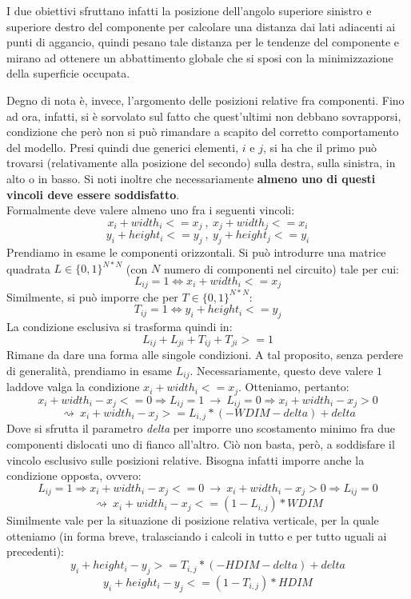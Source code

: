 I due obiettivi sfruttano infatti la posizione dell'angolo superiore sinistro e superiore destro del componente per calcolare una distanza dai lati adiacenti ai punti di aggancio, quindi pesano tale distanza per le tendenze del componente e mirano ad ottenere un abbattimento globale che si sposi con la minimizzazione della superficie occupata.

Degno di nota è, invece, l'argomento delle posizioni relative fra componenti. Fino ad ora, infatti, si è sorvolato sul fatto che quest'ultimi non debbano sovrapporsi, condizione che però non si può rimandare a scapito del corretto comportamento del modello. Presi quindi due generici elementi, $i$ e $j$, si ha che il primo può trovarsi (relativamente alla posizione del secondo) sulla destra, sulla sinistra, in alto o in basso. Si noti inoltre che necessariamente \textbf{almeno uno di questi vincoli deve essere soddisfatto}.\\
Formalmente deve valere almeno uno fra i seguenti vincoli:
$$ x_i + width_i <= x_j~,~x_j + width_j <= x_i$$ $$y_i + height_i <= y_j~,~y_j + height_j <= y_i $$
Prendiamo in esame le componenti orizzontali. Si può introdurre una matrice quadrata $L \in \{0, 1\}^{N\ast N}$ (con $N$ numero di componenti nel circuito) tale per cui:
$$L_{ij} = 1 \Leftrightarrow x_i + width_i <= x_j $$
Similmente, si può imporre che per $T \in \{0, 1\}^{N\ast N}$:
$$T_{ij} = 1 \Leftrightarrow y_i + height_i <= y_j $$
La condizione esclusiva si trasforma quindi in:
$$ L_{ij} + L_{ji} + T_{ij} + T_{ji} >= 1 $$
Rimane da dare una forma alle singole condizioni. A tal proposito, senza perdere di generalità, prendiamo in esame $L_{ij}$. Necessariamente, questo deve valere $1$ laddove valga la condizione $ x_i + width_i <= x_j $. Otteniamo, pertanto:
$$ x_i + width_i - x_j <= 0\Rightarrow L_{ij} = 1~\rightarrow~L_{ij} = 0\Rightarrow x_i + width_i - x_j > 0 $$
$$\rightsquigarrow~x_i + width_i - x_j >= L_{i, j}\ast \left(- WDIM - delta\right) + delta $$
Dove si sfrutta il parametro \textit{delta} per imporre uno scostamento minimo fra due componenti dislocati uno di fianco all'altro. Ciò non basta, però, a soddisfare il vincolo esclusivo sulle posizioni relative. Bisogna infatti imporre anche la condizione opposta, ovvero:
$$ L_{ij} = 1\Rightarrow x_i + width_i - x_j <= 0~\rightarrow~x_i + width_i - x_j > 0\Rightarrow L_{ij} = 0 $$
$$\rightsquigarrow~x_i + width_i - x_j <= \left( 1 - L_{i, j}\right)\ast WDIM $$
Similmente vale per la situazione di posizione relativa verticale, per la quale otteniamo (in forma breve, tralasciando i calcoli in tutto e per tutto uguali ai precedenti):
$$ y_i + height_i - y_j >= T_{i, j}\ast \left(- HDIM - delta\right) + delta $$
$$ y_i + height_i - y_j <= \left( 1 - T_{i, j}\right)\ast HDIM $$

